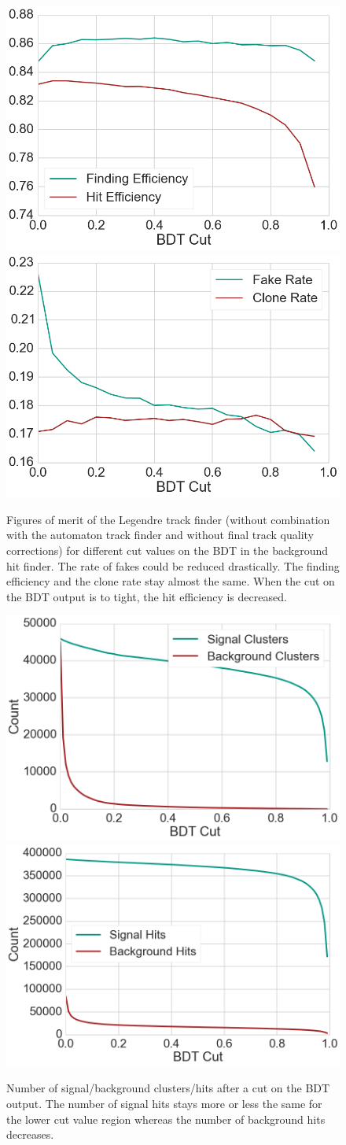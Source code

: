 \begin{figure}
  \centering
  \includegraphics[width=0.48\linewidth]{figures/workflow/background_hit_finder_efficiency.png}
  \includegraphics[width=0.48\linewidth]{figures/workflow/background_hit_finder_rate.png}
  \caption{Figures of merit of the Legendre track finder (without combination with the automaton track finder and without final track quality corrections) for different cut values on the BDT in the background hit finder. The rate of fakes could be reduced drastically. The finding efficiency and the clone rate stay almost the same. When the cut on the BDT output is to tight, the hit efficiency is decreased.}
  \label{fig-result-background-hit-finder2}
\end{figure}

\begin{figure}
  \centering
  \includegraphics[width=0.48\linewidth]{figures/workflow/number_of_clusters.png}
  \includegraphics[width=0.48\linewidth]{figures/workflow/number_of_hits.png}
  \caption{Number of signal/background clusters/hits after a cut on the BDT output. The number of signal hits stays more or less the same for the lower cut value region whereas the number of background hits decreases.}
  \label{fig-hits-numbers}
\end{figure}

